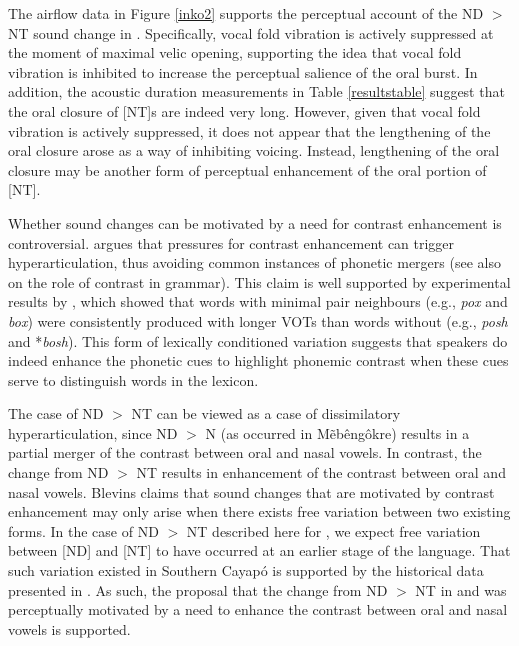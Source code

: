 \documentclass[output=paper,hidelinks]{langscibook}
\begin{document}
The airflow data in Figure \ref{inko2} supports the perceptual account of the ND $>$ NT sound change in . Specifically, vocal fold vibration is actively suppressed at the moment of maximal velic opening, supporting the idea that vocal fold vibration is inhibited to increase the perceptual salience of the oral burst. In addition, the acoustic duration measurements in Table \ref{resultstable} suggest that the oral closure of  [NT]s are indeed very long. However, given that vocal fold vibration is actively suppressed, it does not appear that the lengthening of the oral closure arose as a way of inhibiting voicing. Instead, lengthening of the oral closure may be another form of perceptual enhancement of the oral portion of [NT].

Whether sound changes can be motivated by a need for contrast enhancement is controversial. \citet[205]{blevins2004} argues that pressures for contrast enhancement can trigger hyperarticulation, thus avoiding common instances of phonetic mergers (see also \citealt{Flemming2002, Flemming2008a, Flemming2008b} on the role of contrast in grammar). This claim is well supported by experimental results by \citet{BaeseBerkGoldrick2009}, which showed that words with minimal pair neighbours (e.g., \textit{pox} and \textit{box}) were consistently produced with longer VOTs than words without (e.g., \textit{posh} and *\textit{bosh}). This form of lexically conditioned variation suggests that speakers do indeed enhance the phonetic cues to highlight phonemic contrast when these cues serve to distinguish words in the lexicon. 

The case of ND $>$ NT can be viewed as a case of dissimilatory hyperarticulation, since ND $>$ N (as occurred in M\~eb\^eng\^okre) results in a partial merger of the contrast between oral and nasal vowels. In contrast, the change from ND $>$ NT results in enhancement of the contrast between oral and nasal vowels. Blevins claims that sound changes that are motivated by contrast enhancement may only arise when there exists free variation between two existing forms. In the case of ND $>$ NT described here for , we expect free variation between [ND] and [NT] to have occurred at an earlier stage of the language. That such variation existed in Southern Cayap\'o is supported by the historical data presented in . As such, the proposal that the change from ND $>$ NT in  and  was perceptually motivated by a need to enhance the contrast between oral and nasal vowels is supported. 
\end{document}
